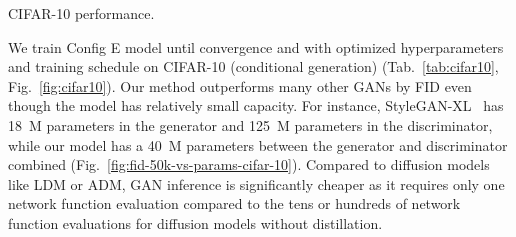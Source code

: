 \begin{table}
\vspace{-0.75cm}
\centering
\caption{\label{tab:cifar10}CIFAR-10 performance.}
\vspace{-0.4cm}
\end{table}

We train Config E model until convergence and with optimized hyperparameters and training schedule on CIFAR-10 (conditional generation) (Tab.~\ref{tab:cifar10}, Fig.~\ref{fig:cifar10}). Our method outperforms many other GANs by FID even though the model has relatively small capacity. For instance, StyleGAN-XL~\cite{sgxl} has 18\ M parameters in the generator and 125\ M parameters in the discriminator, while our model has a 40\ M parameters between the generator and discriminator combined (Fig.~\ref{fig:fid-50k-vs-params-cifar-10}). Compared to diffusion models like LDM or ADM, GAN inference is significantly cheaper as it requires only one network function evaluation compared to the tens or hundreds of network function evaluations for diffusion models without distillation. 

